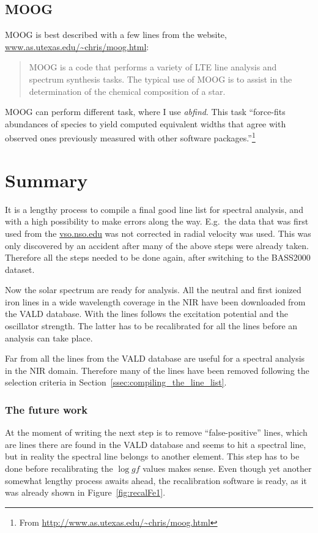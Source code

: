 \documentclass{aa}
\begin{document}
\subsection{MOOG}
\label{sub:moog}
MOOG is best described with a few lines from the website,
\url{www.as.utexas.edu/~chris/moog.html}:
\begin{quote}
    MOOG is a code that performs a variety of LTE line analysis and spectrum
    synthesis tasks. The typical use of MOOG is to assist in the determination
    of the chemical composition of a star.
\end{quote}
MOOG can perform different task, where I use \emph{abfind}. This task
``force-fits abundances of species to yield computed equivalent widths that
agree with observed ones previously measured with other software
packages.''\footnote{From \url{http://www.as.utexas.edu/~chris/moog.html}}



\section{Summary}
\label{sec:conclusion}
It is a lengthy process to compile a final good line list for spectral
analysis, and with a high possibility to make errors along the way. E.g.\ the
data that was first used from the \url{vso.nso.edu} was not corrected in radial
velocity was used. This was only discovered by an accident after many of the
above steps were already taken. Therefore all the steps needed to be done
again, after switching to the BASS2000 dataset.

Now the solar spectrum are ready for analysis. All the neutral and first
ionized iron lines in a wide wavelength coverage in the NIR have been
downloaded from the VALD database. With the lines follows the excitation
potential and the oscillator strength. The latter has to be recalibrated for
all the lines before an analysis can take place.

Far from all the lines from the VALD database are useful for a spectral
analysis in the NIR domain. Therefore many of the lines have been removed
following the selection criteria in Section~\ref{ssec:compiling_the_line_list}.

\subsubsection{The future work}
\label{ssub:the_future_work}
At the moment of writing the next step is to remove ``false-positive'' lines,
which are lines there are found in the VALD database and seems to hit a
spectral line, but in reality the spectral line belongs to another element.
This step has to be done before recalibrating the $\log gf$ values makes sense.
Even though yet another somewhat lengthy process awaits ahead, the
recalibration software is ready, as it was already shown in
Figure~\ref{fig:recalFe1}.
\end{document}
